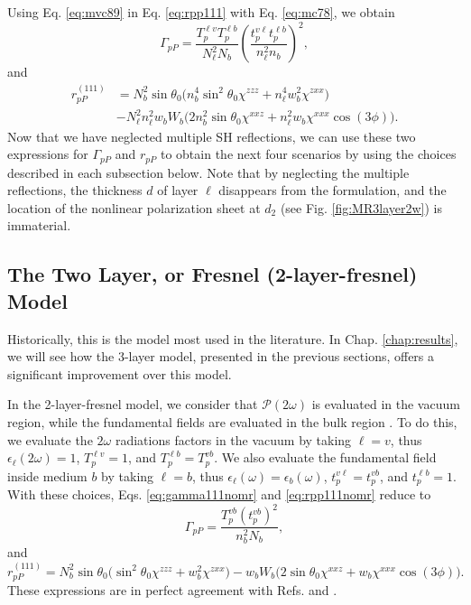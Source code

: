 Using Eq. \eqref{eq:mvc89} in Eq. \eqref{eq:rpp111} with Eq. \eqref{eq:mc78}, we
obtain
\begin{equation}\label{eq:gamma111nomr}
\Gamma_{pP}=
\frac{T_{p}^{\ell v}T^{\ell b}_{p}}{N^{2}_{\ell}N_{b}}
\left(\frac{t_{p}^{v\ell}t^{\ell b}_{p}}{n^{2}_{\ell}n_{b}}\right)^{2},  
\end{equation}
and
\begin{equation}\label{eq:rpp111nomr}
\begin{split}
r^{(111)}_{pP}& =
N^{2}_{b}\sin\theta_{0}
\Big(
  n^{4}_{b}\sin^{2}\theta_{0}\chi^{zzz} + n^{4}_{\ell}w^2_{b}\chi^{zxx}
\Big)\\
&- N^{2}_{\ell}n^{2}_{\ell}w_{b}W_{b}
\Big(
  2n^{2}_{b}\sin\theta_{0}\chi^{xxz} + n^{2}_{\ell}w_{b}\chi^{xxx}\cos(3\phi) 
\Big).
\end{split}
\end{equation}
Now that we have neglected multiple SH reflections, we can use these two
expressions for $\Gamma_{pP}$ and $r_{pP}$ to obtain the next four scenarios by
using the choices described in each subsection below. Note that by neglecting
the multiple reflections, the thickness $d$ of layer $\ell$ disappears from the
formulation, and the location of the nonlinear polarization sheet at $d_{2}$
(see Fig. \ref{fig:MR3layer2w}) is immaterial.



\subsection{The Two Layer, or Fresnel (2-layer-fresnel) Model}
\label{sec:2-layer-fresnel}

Historically, this is the model most used in the literature. In Chap.
\ref{chap:results}, we will see how the 3-layer model, presented in the previous
sections, offers a significant improvement over this model. 

In the 2-layer-fresnel model, we consider that
$\boldsymbol{\mathcal{P}}(2\omega)$ is evaluated in the vacuum region, while the
fundamental fields are evaluated in the bulk region \cite{sipePRB87,
mizrahiJOSA88}. To do this, we evaluate the $2\omega$ radiations factors in the
vacuum by taking $\ell = v$, thus $\epsilon_{\ell}(2\omega) = 1$, $T^{\ell
v}_{p} = 1$, and $T^{\ell b}_{p} = T^{vb}_{p}$. We also evaluate the fundamental
field inside medium $b$ by taking $\ell = b$, thus $\epsilon_{\ell}(\omega) =
\epsilon_{b}(\omega)$, $t^{v\ell}_{p} = t^{vb}_{p}$, and $t^{\ell b}_{p} = 1$.
With these choices, Eqs. \eqref{eq:gamma111nomr} and \eqref{eq:rpp111nomr}
reduce to
\begin{equation}\label{eq:m78}
\Gamma_{pP}
= \frac{T^{v b}_{p}(t^{vb}_{p})^2}{n^{2}_{b}N_{b}}, 
\end{equation}
and
\begin{equation}\label{eq:m82}
r^{(111)}_{pP} =
N^{2}_{b}\sin\theta_{0}
\Big(
\sin^{2}\theta_{0}\chi^{zzz} + w^{2}_{b}\chi^{zxx}
\Big)
- w_{b}W_{b}
\Big(
2\sin\theta_{0}\chi^{xxz} + w_{b}\chi^{xxx}\cos(3\phi)
\Big).
\end{equation}
These expressions are in perfect agreement with Refs. \cite{sipePRB87} and
\cite{mizrahiJOSA88}.


